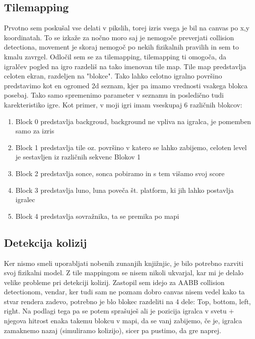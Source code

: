 \documentclass[a4paper,11pt]{article}
\begin{document}
\subsection{Tilemapping}

Prvotno sem poskušal vse delati v pikslih, torej izris vsega je bil na canvas po x,y koordinatah. To se izkaže za nočno moro saj je nemogoče preverjati collision detectiona, movement je skoraj nemogoč po nekih fizikalnih pravilih in sem to kmalu zavrgel. 
Odločil sem se za tilemapping, tilemapping ti omogoča, da igralčev pogled na igro razdeliš na tako imenovan tile map. Tile map predstavlja celoten ekran, razdeljen na "blokce". Tako lahko celotno igralno površino predstavimo kot en ogromed 2d seznam, kjer pa imamo vrednosti vsakega blokca posebaj. Tako samo spremenimo parameter v seznamu in posledično tudi karekteristiko igre. Kot primer, v moji igri imam vseskupaj 6 različnih blokcov:
\begin{enumerate}
	\item Block 0 predstavlja backgroud, background ne vpliva na igralca, je pomemben samo za izris
	\item Block 1 predstavlja tile oz. površino v katero se lahko zabijemo, celoten level je sestavljen iz
	različnih sekvenc Blokov 1
	\item Block 2 predstavlja sonce, sonca pobiramo in s tem višamo svoj score
	\item Block 3 predstavlja luno, luna poveča št. platform, ki jih lahko postavlja igralec
	\item Block 4 predstavlja sovražnika, ta se premika po mapi
\end{enumerate}
\pagebreak
\subsection{Detekcija kolizij}

Ker nismo smeli uporabljati nobenih zunanjih knjižnjic, je bilo potrebno razviti svoj fizikalni model. Z tile mappingom se nisem nikoli ukvarjal, kar mi je delalo velike probleme pri detekciji kolizij. Zastopil sem idejo za AABB collision detectionom, vendar, ker tudi sam ne poznam dobro canvas nisem vedel kako ta stvar rendera zadevo, potrebno je blo blokec razdeliti na 4 dele: Top, bottom, left, right. Na podlagi tega pa se potem sprašuješ ali je pozicija igralca v svetu + njegova hitrost enaka takemu blokcu v mapi, da se vanj zabijemo, če je, igralca zamaknemo nazaj (simuliramo kolizijo), sicer pa pustimo, da gre naprej.
\end{document}
